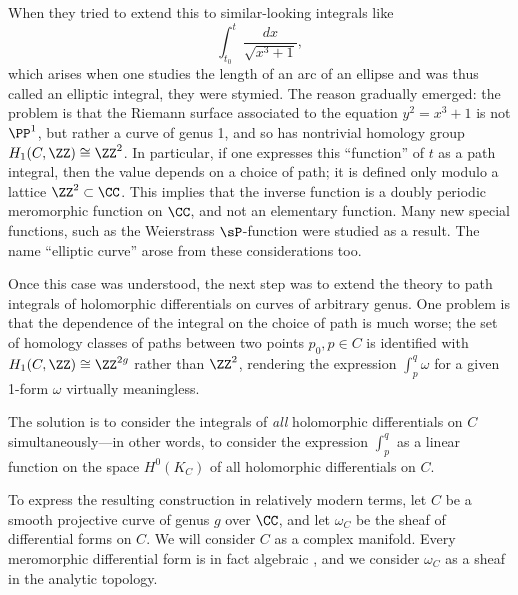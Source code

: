 When they tried to extend this to similar-looking integrals like
$$
\int_{t_0}^t \frac{dx}{\sqrt{x^3+1}},
$$
which arises when one studies the length of an arc of an ellipse and was thus called an elliptic integral, they were stymied. The reason gradually emerged: the problem is that the Riemann surface associated to the equation $y^2 = x^3+1$ is not $\PP^1$, but rather a curve of genus 1, and so has nontrivial homology group $H_1(C, \ZZ) \cong \ZZ^2$. In particular, if one expresses this ``function'' of $t$  as a path integral, then the value depends on a choice of path; it is defined only modulo a lattice $\ZZ^2 \subset \CC$. This implies that the inverse function is a doubly periodic meromorphic function on $\CC$, and not an elementary function. Many new special functions, such as the Weierstrass $\sP$-function were studied as a result. The name ``elliptic curve'' arose from these considerations too.

Once this case was understood, the next step was to extend the theory to path integrals of holomorphic differentials on curves of arbitrary genus. One problem is that the dependence of the integral on the choice of path is much worse; the set of homology classes of paths between two points $p_0, p \in C$ is identified with $H_1(C,\ZZ) \cong \ZZ^{2g}$ rather than $\ZZ^2$, rendering the expression $\int_p^q \omega$ for a given 1-form $\omega$ virtually meaningless.

The solution is to  consider the integrals of \emph{all} holomorphic differentials on $C$ simultaneously---in other words, to consider the expression $\int_p^q$ as a linear function on the space $H^0(K_C)$ of all holomorphic differentials on $C$.

To express the resulting construction in relatively modern terms, let $C$ be a smooth projective curve of genus $g$ over $\CC$, and let $\omega_{C}$ be the sheaf of differential forms on $C$. We will consider $C$ as a complex manifold. Every meromorphic differential form is in fact algebraic
\cite{****}, and we consider $\omega_{C}$ as a sheaf in the analytic topology.

